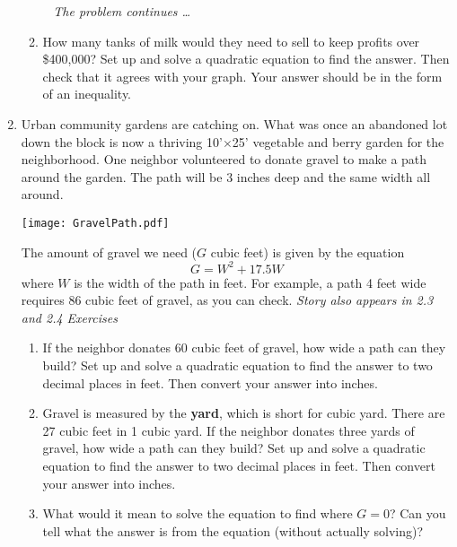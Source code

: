 \begin{enumerate}
\begin{enumerate}
\newpage %
~\hspace{-.5in} \emph{The problem continues \ldots}

\item How many tanks of milk would they need to sell to keep profits over \$400,000?  Set up and solve a quadratic equation to find the answer.  Then check that it agrees with your graph.   Your answer should be in the form of an inequality. \vfill
\end{enumerate}

\newpage %

 \item Urban community gardens are catching on.  What was once an abandoned lot down the block is now a thriving 10'$\times$25' vegetable and berry garden for the neighborhood. One neighbor  volunteered to donate  gravel to make a path around the garden.  The path will be 3 inches deep and the same width all around.   
\begin{center}
\scalebox {.4} {\texttt{[image: GravelPath.pdf]}}
\end{center}
The amount of gravel we need ($G$ cubic feet) is given by the equation  $$G = W^2 + 17.5W$$
where $W$ is the width of the path in feet.  For example, a path 4 feet wide requires 86 cubic feet of gravel, as you can check.
\hfill \emph{Story also appears in 2.3 and 2.4 Exercises}
\begin{enumerate}
\item  If the neighbor donates 60 cubic feet of gravel, how wide a path can they build?  Set up and solve a quadratic equation to find the answer to two decimal places in feet. Then convert your answer into inches. \vfill
\item Gravel is measured by the \textbf{yard}, which is short for cubic yard.  There are 27 cubic feet in 1 cubic yard.  If the neighbor donates three yards of gravel, how wide a path can they build? Set up and solve a quadratic equation to find the answer to two decimal places in feet. Then convert your answer into inches. \vfill
\item What would it mean to solve the equation to find where $G=0$?  Can you tell what the answer is from the equation (without actually solving)? \bigskip
\end{enumerate}

\end{enumerate}

